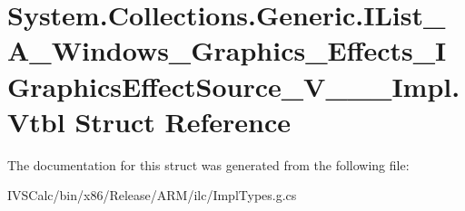 \hypertarget{struct_system_1_1_collections_1_1_generic_1_1_i_list___a___windows___graphics___effects___i_grap88e3f2d331d689b1d12a5b13dec9ad95}{}\section{System.\+Collections.\+Generic.\+I\+List\+\_\+\+A\+\_\+\+Windows\+\_\+\+Graphics\+\_\+\+Effects\+\_\+\+I\+Graphics\+Effect\+Source\+\_\+\+V\+\_\+\+\_\+\+\_\+\+Impl.\+Vtbl Struct Reference}
\label{struct_system_1_1_collections_1_1_generic_1_1_i_list___a___windows___graphics___effects___i_grap88e3f2d331d689b1d12a5b13dec9ad95}


The documentation for this struct was generated from the following file\+:\begin{DoxyCompactItemize}
\item 
I\+V\+S\+Calc/bin/x86/\+Release/\+A\+R\+M/ilc/Impl\+Types.\+g.\+cs\end{DoxyCompactItemize}
